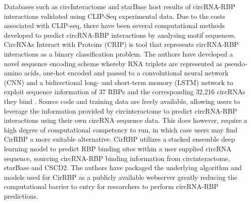 \documentclass[journal,review,submit,pdftex,moreauthors]{Definitions/mdpi}
\begin{document}
Databases such as circInteractome \cite{circinteractome} and starBase \cite{starbase} host results of circRNA-RBP interactions validated using CLIP-Seq experimental data. Due to the costs associated with CLIP-seq, there have been several computational methods developed to predict circRNA-RBP interactions by analysing motif sequences. CircRNAs Interact with Proteins (CRIP) is tool that represents circRNA-RBP interactions as a binary classification problem. The authors have developed a novel sequence encoding scheme whereby RNA triplets are represented as pseudo-amino acids, one-hot encoded and passed to a convolutional neural network (CNN) and a bidirectional long- and short-term memory (LSTM) network to exploit sequence information of 37 RBPs and the corresponding 32,216 circRNAs they bind \cite{CRIP}. Source code and training data are freely available, allowing users to leverage the information provided by circinteractome to predict circRNA-RBP interactions using their own circRNA sequence data. This does however, require a high degree of computational competency to run, in which case users may find CirRBP \cite{CirRBP} a more suitable alternative. CirRBP utilizes a stacked ensemble deep learning model to predict RBP binding sites within a user supplied circRNA sequence, sourcing circRNA-RBP binding information from circinteractome, starBase and CSCD2. The authors have packaged the underlying algorithm and models used for CirRBP as a publicly available webserver \cite{cirRBP-website} greatly reducing the computational barrier to entry for researchers to perform circRNA-RBP predictions. 
\end{document}
